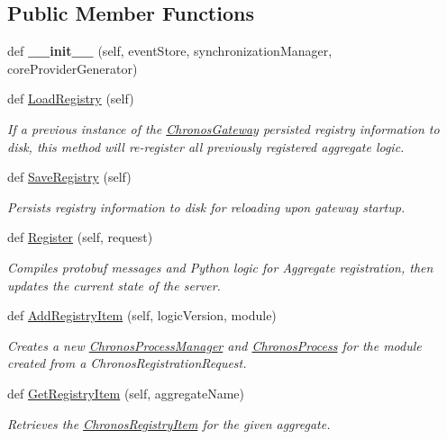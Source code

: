\subsection*{Public Member Functions}
\begin{DoxyCompactItemize}
\item 
def {\bfseries \+\_\+\+\_\+init\+\_\+\+\_\+} (self, event\+Store, synchronization\+Manager, core\+Provider\+Generator)
\item 
def \hyperlink{group__Chronos_ga6d1d412b8ee16cf3bf7be976a4041ced}{Load\+Registry} (self)
\begin{DoxyCompactList}\small\item\em If a previous instance of the \hyperlink{classChronos_1_1Gateway_1_1ChronosGateway}{Chronos\+Gateway} persisted registry information to disk, this method will re-\/register all previously registered aggregate logic. \end{DoxyCompactList}\item 
def \hyperlink{group__Chronos_ga20a6380c276ad93d3f59832c88b1b863}{Save\+Registry} (self)
\begin{DoxyCompactList}\small\item\em Persists registry information to disk for reloading upon gateway startup. \end{DoxyCompactList}\item 
def \hyperlink{group__Chronos_ga99107362643b72b54fdabf6d6d5ab0e9}{Register} (self, request)
\begin{DoxyCompactList}\small\item\em Compiles protobuf messages and Python logic for Aggregate registration, then updates the current state of the server. \end{DoxyCompactList}\item 
def \hyperlink{group__Chronos_ga4e8e260962d11dc692f37a03da88e48a}{Add\+Registry\+Item} (self, logic\+Version, module)
\begin{DoxyCompactList}\small\item\em Creates a new \hyperlink{classChronos_1_1Gateway_1_1ChronosProcessManager}{Chronos\+Process\+Manager} and \hyperlink{classChronos_1_1Gateway_1_1ChronosProcess}{Chronos\+Process} for the module created from a Chronos\+Registration\+Request. \end{DoxyCompactList}\item 
def \hyperlink{group__Chronos_ga62459e3c9eae9e1ea22841512298b40b}{Get\+Registry\+Item} (self, aggregate\+Name)
\begin{DoxyCompactList}\small\item\em Retrieves the \hyperlink{classChronos_1_1Gateway_1_1ChronosRegistryItem}{Chronos\+Registry\+Item} for the given aggregate. \end{DoxyCompactList}\item 

\end{DoxyCompactItemize}

